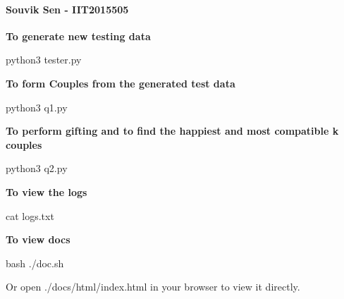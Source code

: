 \paragraph*{Souvik Sen -\/ I\+I\+T2015505}

{\bfseries To generate new testing data}


\begin{DoxyCode}
python3 tester.py
\end{DoxyCode}


{\bfseries To form Couples from the generated test data}


\begin{DoxyCode}
python3 q1.py
\end{DoxyCode}


{\bfseries To perform gifting and to find the happiest and most compatible k couples}


\begin{DoxyCode}
python3 q2.py
\end{DoxyCode}


{\bfseries To view the logs}


\begin{DoxyCode}
cat logs.txt
\end{DoxyCode}


{\bfseries To view docs}


\begin{DoxyCode}
bash ./doc.sh
\end{DoxyCode}
 Or open ./docs/html/index.html in your browser to view it directly. 